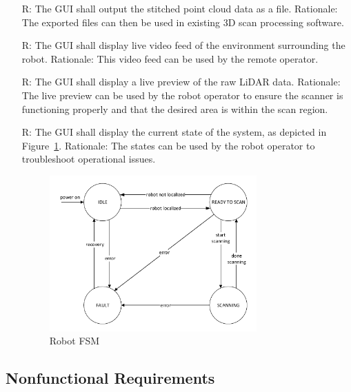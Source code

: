 \documentclass[12pt]{article}
\newcounter{reqnum} %
\begin{document}
\begin{itemize}
\item[R\refstepcounter{reqnum}\thereqnum \label{R_Output1}:] The GUI shall output the stitched point cloud data as a file.
\newline Rationale: The exported files can then be used in existing 3D scan processing software.
\item[R\refstepcounter{reqnum}\thereqnum \label{R_Output2}:] The GUI shall display live video feed of the environment surrounding the robot.
Rationale: This video feed can be used by the remote operator.
\item[R\refstepcounter{reqnum}\thereqnum \label{R_Output3}:] The GUI shall display a live preview of the raw LiDAR data. 
\newline Rationale: The live preview can be used by the robot operator to ensure the scanner is functioning properly and that the desired area is within the scan region.
\item[R\refstepcounter{reqnum}\thereqnum \label{R_Output4}:] The GUI shall display the current state of the system, as depicted in Figure~\ref{Fig_RobotFSM}.
\newline Rationale: The states can be used by the robot operator to troubleshoot operational issues.

\begin{figure}[H]
\begin{center}
 \includegraphics[width=0.75\textwidth]{Figures/Robot FSM.pdf}
\caption{Robot FSM}
\label{Fig_RobotFSM} 
\end{center}
\end{figure}
\end{itemize}

\subsection{Nonfunctional Requirements}
\end{document}

